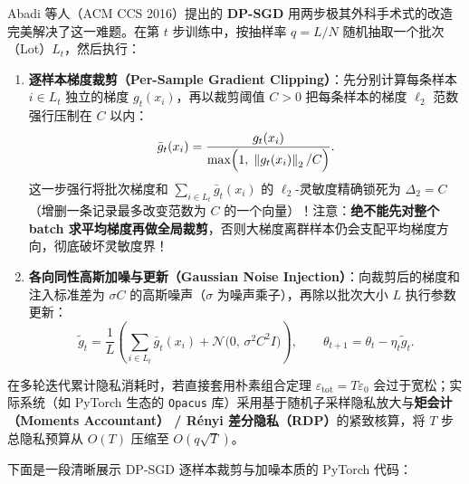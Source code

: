 Abadi 等人（ACM CCS 2016）提出的 \textbf{DP-SGD} 用两步极其外科手术式的改造完美解决了这一难题。在第 $t$ 步训练中，按抽样率 $q = L / N$ 随机抽取一个批次（Lot）$L_t$，然后执行：
\begin{enumerate}
  \item \textbf{逐样本梯度裁剪（Per-Sample Gradient Clipping）}：先分别计算每条样本 $i \in L_t$ 独立的梯度 $g_t(x_i)$，再以裁剪阈值 $C > 0$ 把每条样本的梯度 $\ell_2$ 范数强行压制在 $C$ 以内：
  \begin{equation}\label{eq:dpsgd-clip}
    \bar{g}_t(x_i) = \frac{g_t(x_i)}{\max\!\Big(1,\; \left\|g_t(x_i)\right\|_2 / C\Big)}.
  \end{equation}
  这一步强行将批次梯度和 $\sum_{i \in L_t} \bar{g}_t(x_i)$ 的 $\ell_2$-灵敏度精确锁死为 $\Delta_2 = C$（增删一条记录最多改变范数为 $C$ 的一个向量）！注意：\textbf{绝不能先对整个 batch 求平均梯度再做全局裁剪}，否则大梯度离群样本仍会支配平均梯度方向，彻底破坏灵敏度界！
  \item \textbf{各向同性高斯加噪与更新（Gaussian Noise Injection）}：向裁剪后的梯度和注入标准差为 $\sigma C$ 的高斯噪声（$\sigma$ 为噪声乘子），再除以批次大小 $L$ 执行参数更新：
  \begin{equation}\label{eq:dpsgd-noise}
    \tilde{g}_t = \frac{1}{L}\!\left(\sum_{i \in L_t} \bar{g}_t(x_i) + \mathcal{N}\!\big(0,\, \sigma^2 C^2 I\big)\right),
    \qquad \theta_{t+1} = \theta_t - \eta_t \tilde{g}_t.
  \end{equation}
\end{enumerate}
在多轮迭代累计隐私消耗时，若直接套用朴素组合定理 $\varepsilon_{\text{tot}} = T\varepsilon_0$ 会过于宽松；实际系统（如 PyTorch 生态的 \texttt{Opacus} 库）采用基于随机子采样隐私放大与\textbf{矩会计（Moments Accountant） / R\'enyi 差分隐私（RDP）}的紧致核算，将 $T$ 步总隐私预算从 $O(T)$ 压缩至 $O(q\sqrt{T})$。

下面是一段清晰展示 DP-SGD 逐样本裁剪与加噪本质的 PyTorch 代码：

